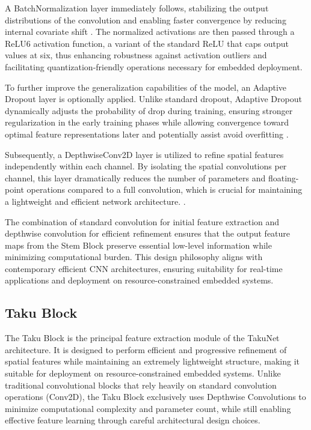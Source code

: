 A BatchNormalization layer immediately follows, stabilizing the output distributions of the convolution and enabling faster convergence by reducing internal covariate shift \cite{BatchNorm}. The normalized activations are then passed through a ReLU6 activation function, a variant of the standard ReLU that caps output values at six, thus enhancing robustness against activation outliers and facilitating quantization-friendly operations necessary for embedded deployment\cite{ConvNetworks}.

To further improve the generalization capabilities of the model, an Adaptive Dropout layer is optionally applied. Unlike standard dropout, Adaptive Dropout dynamically adjusts the probability of drop during training, ensuring stronger regularization in the early training phases while allowing convergence toward optimal feature representations later and potentially assist avoid overfitting \cite{Dropout} .

Subsequently, a DepthwiseConv2D layer is utilized to refine spatial features independently within each channel. By isolating the spatial convolutions per channel, this layer dramatically reduces the number of parameters and floating-point operations compared to a full convolution, which is crucial for maintaining a lightweight and efficient network architecture. \cite{ConvNetworks}.

The combination of standard convolution for initial feature extraction and depthwise convolution for efficient refinement ensures that the output feature maps from the Stem Block preserve essential low-level information while minimizing computational burden. This design philosophy aligns with contemporary efficient CNN architectures, ensuring suitability for real-time applications and deployment on resource-constrained embedded systems\cite{chollet2017xception}.

\subsection{Taku Block}

    The Taku Block is the principal feature extraction module of the TakuNet architecture. It is designed to perform efficient and progressive refinement of spatial features while maintaining an extremely lightweight structure, making it suitable for deployment on resource-constrained embedded systems. 
    Unlike traditional convolutional blocks that rely heavily on standard convolution operations (Conv2D), the Taku Block exclusively uses Depthwise Convolutions to minimize computational complexity and parameter count, while still enabling effective feature learning through careful architectural design choices.
    

